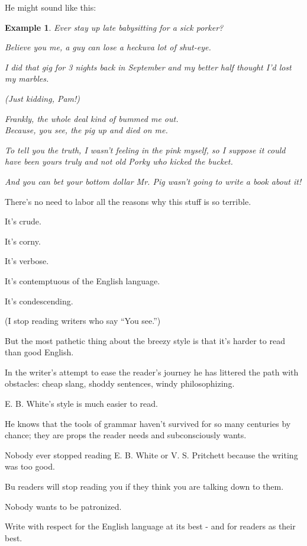 \documentclass{book}
\numberwithin{equation}{section}
\newtheorem{example}{Example}[chapter]
\begin{document}
He might sound like this:
\begin{example}
    Ever stay up late babysitting for a sick porker?
    
    Believe you me, a guy can lose a heckuva lot of shut-eye.
    
    I did that gig for 3 nights back in September and my better half thought I'd lost my marbles.
    
    
    (Just kidding, Pam!)
    
    Frankly, the whole deal kind of bummed me out.\\
    
    Because, you see, the pig up and died on me.
    
    To tell you the truth, I wasn't feeling in the pink myself, so I suppose it could have been yours truly and not old Porky who kicked the bucket.
    
    And you can bet your bottom dollar Mr. Pig wasn't going to write a book about it!
\end{example}
There's no need to labor all the reasons why this stuff is so terrible.

It's crude.

It's corny.

It's verbose.

It's contemptuous of the English language.

It's condescending.

(I stop reading writers who say ``You see.'')

But the most pathetic thing about the breezy style is that it's harder to read than good English.

In the writer's attempt to ease the reader's journey he has littered the path with obstacles: cheap slang, shoddy sentences, windy philosophizing.

E. B. White's style is much easier to read.

He knows that the tools of grammar haven't survived for so many centuries by chance; they are props the reader needs and subconsciously wants.

Nobody ever stopped reading E. B. White or V. S. Pritchett because the writing was too good.

Bu readers will stop reading you if they think you are talking down to them.

Nobody wants to be patronized.

Write with respect for the English language at its best - and for readers as their best.
\end{document}
